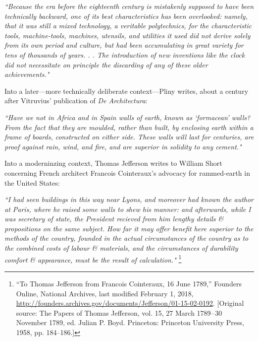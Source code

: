 \begin{flushright}
\small{
\textit{
``Because the era before the eighteenth century is mistakenly supposed to have been technically backward, one of its best characteristics has been overlooked: namely, that it was still a mixed technology, a veritable polytechnics, for the characteristic tools, machine-tools, machines, utensils, and utilities it used did not derive solely from its own period and culture, but had been accumulating in great variety for tens of thousands of years. . . The introduction of new inventions like the clock did not necessitate on principle the discarding of any of these older achievements." \cite[p.134]{PENTAGON}}}
\end{flushright}

\clearpage

Into a later---more technically deliberate context---Pliny writes, about a century after Vitruvius' publication of \textit{De Architectura}:

\begin{flushright}
\small{
\textit{``Have we not in Africa and in Spain walls of earth, known as `formacean' walls? From the fact that they are moulded, rather than built, by enclosing earth within a frame of boards, constructed on either side. These walls will last for centuries, are proof against rain, wind, and fire, and are superior in solidity to any cement."}} \cite[p385]{NATHISTORY}
\end{flushright}

Into a moderninzing context, Thomas Jefferson writes to William Short concerning French architect Francois Cointeraux's advocacy for rammed-earth in the United States:

\begin{flushright}
\small{
\textit{``I had seen buildings in this way near Lyons, and moreover had known the author at Paris, where he raised some walls to shew his manner: and afterwards, while I was secretary of state, the President recieved from him lengthy details \& propositions on the same subject. How far it may offer benefit here superior to the methods of the country, founded in the actual circumstances of the country as to the combined costs of labour \& materials, and the circumstances of durability comfort \& appearance, must be the result of calculation."}} \footnote{“To Thomas Jefferson from Francois Cointeraux, 16 June 1789,” Founders Online, National Archives, last modified February 1, 2018, \url{http://founders.archives.gov/documents/Jefferson/01-15-02-0192}. [Original source: The Papers of Thomas Jefferson, vol. 15, 27 March 1789 – 30 November 1789, ed. Julian P. Boyd. Princeton: Princeton University Press, 1958, pp. 184–186.]}
\end{flushright}


